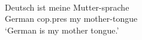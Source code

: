\ea
{}\\
\gll Deutsch ist meine Mutter-sprache\\
     German cop.pres my mother-tongue\\
\glt `German is my mother tongue.'
\z
